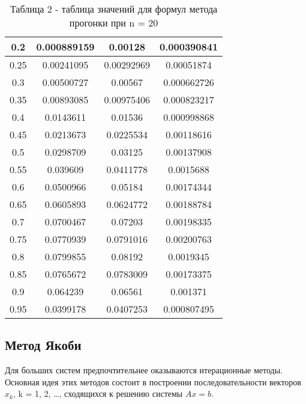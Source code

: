 \documentclass[a4paper,12pt]{article}
\begin{document}
\begin{enumerate}[label = \arabic*.]
{\begin{table}[h]
\begin{tabular}{|c|c|c|c|}
          0.2 &  0.000889159 &      0.00128 &  0.000390841\\ \hline
          0.25 &   0.00241095 &   0.00292969 &   0.00051874\\ \hline
          0.3 &   0.00500727 &      0.00567 &  0.000662726\\ \hline
          0.35 &   0.00893085 &   0.00975406 &  0.000823217\\ \hline
          0.4 &    0.0143611 &      0.01536 &  0.000998868\\ \hline
          0.45 &    0.0213673 &    0.0225534 &   0.00118616\\ \hline
          0.5 &    0.0298709 &      0.03125 &   0.00137908\\ \hline
          0.55 &     0.039609 &    0.0411778 &    0.0015688\\ \hline
          0.6 &    0.0500966 &      0.05184 &   0.00174344\\ \hline
          0.65 &    0.0605893 &    0.0624772 &   0.00188784\\ \hline
          0.7 &    0.0700467 &      0.07203 &   0.00198335\\ \hline
          0.75 &    0.0770939 &    0.0791016 &   0.00200763\\ \hline
          0.8 &    0.0799855 &      0.08192 &    0.0019345\\ \hline
          0.85 &    0.0765672 &    0.0783009 &   0.00173375\\ \hline
          0.9 &     0.064239 &      0.06561 &     0.001371\\ \hline
          0.95 &    0.0399178 &    0.0407253 &  0.000807495\\ \hline
      \end{tabular}
      \caption*{\small{Таблица 2 - таблица значений для формул метода прогонки при n = 20}}
      \end{table}
    }
\end{enumerate}
\newpage



\subsection{Метод Якоби}  

\hspace{1cm} Для больших систем предпочтительнее оказываются итерационные методы. Основная идея этих методов состоит 
в построении последовательности векторов $x_k$, k = 1, 2, \dots, сходящихся к решению системы $Ax = b$.
\end{document}
